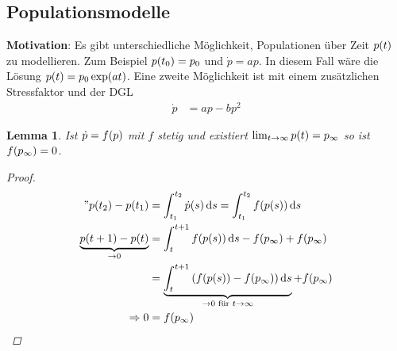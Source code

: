 \documentclass[11pt, a4paper]{article}
\theoremstyle{plain}
\newtheorem{lemma}[blockelement]{Lemma}
\numberwithin{equation}{subsection}
\newcommand{\pair}[1]{\left(#1\right)}
\newcommand{\of}[1]{\mathopen{}\mathclose{}\bgroup\left(#1\aftergroup\egroup\right)}
\newcommand{\impl}[0]{\Rightarrow{}}
\newcommand{\dif}{\mathop{}\!\mathrm{d}}
\newcommand{\toinf}{\to\infty}
\begin{document}
    \subsection{Populationsmodelle}

    \marginnote{[14. Jul]}
    \noindent \textbf{Motivation}: Es gibt unterschiedliche Möglichkeit, Populationen über Zeit $p\of{t}$ zu modellieren. Zum Beispiel $p\of{t_0} = p_0$ und $\dot p = a p$. In diesem Fall wäre die Lösung $p\of{t} = p_0 \exp\of{at}$. Eine zweite Möglichkeit ist mit einem zusätzlichen Stressfaktor und der DGL
    \begin{align*}
        \dot p &= ap - bp^2
    \end{align*}

    \begin{lemma}
        Ist $\dot p = f\of{p}$ mit $f$ stetig und existiert $\lim_{t\toinf} p\of{t} = p_{\infty}$ so ist $f\of{p_{\infty}} = 0$.
        \begin{proof}
            \begin{align*}
                "p\of{t_2} - p\of{t_1} &= \int_{t_1}^{t_2} \dot p\of{s} \dif s = \int_{t_1}^{t_2} f\of{p\of{s}} \dif s\\
                \underbrace{p\of{t+1} - p\of{t}}_{\to 0} &= \int_{t}^{t+1} f\of{p\of{s}} \dif s - f\of{p_{\infty}} + f\of{p_{\infty}}\\
                &= \underbrace{\int_{t}^{t+1} \pair{f\of{p\of{s}} - f\of{p_{\infty}}} \dif s}_{\to 0\text{ für }t\toinf} + f\of{p_{\infty}}\\
                \impl 0 &= f\of{p_{\infty}}\qedhere
            \end{align*}
        \end{proof}
    \end{lemma}
\end{document}
